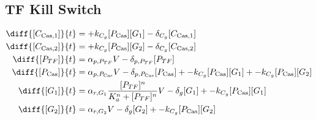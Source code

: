 \subsection{TF Kill Switch}
\label{s:TF_delayed_kill_switch}

\begin{align}
\diff{\conc{\cplx{\cas}{1}}}{t} & =  + \gRnaBind{}\conc{\proSp{\cas{}}}\conc{\gRna{1}} - \casCompDegradeRate{}\conc{\cplx{\cas}{1}}\\ 
\diff{\conc{\cplx{\cas}{2}}}{t} & =  + \gRnaBind{}\conc{\proSp{\cas{}}}\conc{\gRna{2}} - \casCompDegradeRate{}\conc{\cplx{\cas}{2}}\\ 
\diff{\conc{\proSp{TF}}}{t} & =  \txtlRate{\proSp{TF}}\vectorGen{} - \proDegradeRate{\proSp{TF}}\conc{\proSp{TF}}\\ 
\diff{\conc{\proSp{\cas{}}}}{t} & =  \txtlRate{\proSp{\cas{}}}\vectorGen{} - \proDegradeRate{\proSp{\cas{}}}\conc{\proSp{\cas{}}} + - \gRnaBind{}\conc{\proSp{\cas{}}}\conc{\gRna{1}} + - \gRnaBind{}\conc{\proSp{\cas{}}}\conc{\gRna{2}}\\ 
\diff{\conc{\gRna{1}}}{t} & =  \txRate{\gRna{1}}\frac{[\proSp{TF}]^n}{K_a^n + [\proSp{TF}]^n}\vectorGen{} - \rnaDegradeRate{}\conc{\gRna{1}} + - \gRnaBind{}\conc{\proSp{\cas{}}}\conc{\gRna{1}}\\ 
\diff{\conc{\gRna{2}}}{t} & =  \txRate{\gRna{2}}\vectorGen{} - \rnaDegradeRate{}\conc{\gRna{2}} + - \gRnaBind{}\conc{\proSp{\cas{}}}\conc{\gRna{2}}
\end{align}

